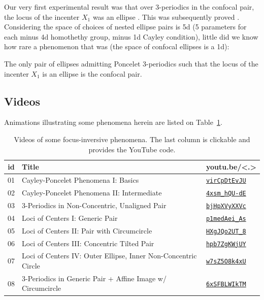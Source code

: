 Our very first experimental result was that over 3-periodics in the confocal pair, the locus of the incenter $X_1$ was an ellipse \cite{reznik2011-incenter}. This was subsequently proved \cite{olga14,garcia2019-incenter}. Considering the space of choices of nested ellipse pairs is 5d (5 parameters for each minus 4d homothethy group, minus 1d Cayley condition), little did we know how rare a phenomenon that was (the space of confocal ellipses is a 1d): 

\begin{conjecture}
 The only pair of ellipses admitting Poncelet 3-periodics such that the locus of the incenter $X_1$ is an ellipse is the confocal pair.
\end{conjecture}

\subsection*{Videos} Animations illustrating some phenomena herein are listed on Table~\ref{tab:playlist}.

\begin{table}[H]
\small
\begin{tabular}{|c|l|l|}
\hline
id & Title & \textbf{youtu.be/<.>}\\
\hline
01 & {Cayley-Poncelet Phenomena I: Basics} &
\href{https://youtu.be/virCpDtEvJU}{\texttt{virCpDtEvJU}}\\
02 & {Cayley-Poncelet Phenomena II: Intermediate} &
\href{https://youtu.be/4xsm\_hQU-dE}{\texttt{4xsm\_hQU-dE}}\\
03 & {3-Periodics in Non-Concentric, Unaligned Pair} &
\href{https://youtu.be/bjHpXVyXXVc}{\texttt{bjHpXVyXXVc}}\\
04 & {Loci of Centers I: Generic Pair} &
\href{https://youtu.be/p1medAei_As}{\texttt{p1medAei\_As}}\\
05 & {Loci of Centers II: Pair with Circumcircle} &
\href{https://youtu.be/HXgJQo2UT_8}{\texttt{HXgJQo2UT\_8}}\\
06 & {Loci of Centers III: Concentric Tilted Pair} &
\href{https://youtu.be/hpb7ZgKWjUY}{\texttt{hpb7ZgKWjUY}}\\
07 & {Loci of Centers IV: Outer Ellipse, Inner Non-Concentric Circle} &
\href{https://youtu.be/w7sZ5O8k4xU}{\texttt{w7sZ5O8k4xU}}\\
08 & {3-Periodics in Generic Pair + Affine Image w/ Circumcircle} &
\href{https://youtu.be/6xSFBLWIkTM}{\texttt{6xSFBLWIkTM}}\\
\hline
\end{tabular}
\caption{Videos of some focus-inversive phenomena. The last column is clickable and provides the YouTube code.}
\label{tab:playlist}
\end{table}


